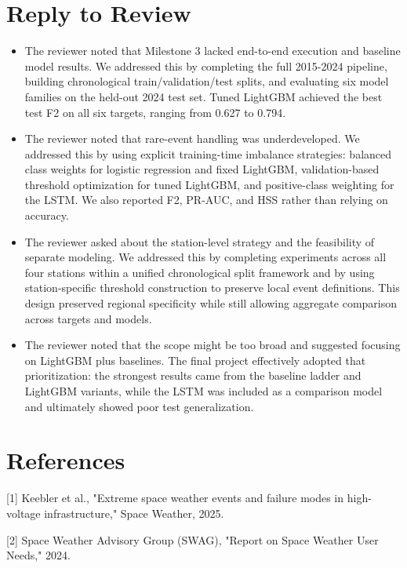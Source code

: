 \documentclass[conference]{IEEEtran}
\begin{document}
\section*{Reply to Review}
\begin{itemize}
    \item The reviewer noted that Milestone 3 lacked end-to-end execution and baseline model results. We addressed this by completing the full 2015-2024 pipeline, building chronological train/validation/test splits, and evaluating six model families on the held-out 2024 test set. Tuned LightGBM achieved the best test F2 on all six targets, ranging from 0.627 to 0.794.

    \item The reviewer noted that rare-event handling was underdeveloped. We addressed this by using explicit training-time imbalance strategies: balanced class weights for logistic regression and fixed LightGBM, validation-based threshold optimization for tuned LightGBM, and positive-class weighting for the LSTM. We also reported F2, PR-AUC, and HSS rather than relying on accuracy.

    \item The reviewer asked about the station-level strategy and the feasibility of separate modeling. We addressed this by completing experiments across all four stations within a unified chronological split framework and by using station-specific threshold construction to preserve local event definitions. This design preserved regional specificity while still allowing aggregate comparison across targets and models.

    \item The reviewer noted that the scope might be too broad and suggested focusing on LightGBM plus baselines. The final project effectively adopted that prioritization: the strongest results came from the baseline ladder and LightGBM variants, while the LSTM was included as a comparison model and ultimately showed poor test generalization.
\end{itemize}

\section*{References}

[1] Keebler et al., "Extreme space weather events and failure modes in high-voltage infrastructure," Space Weather, 2025.

[2] Space Weather Advisory Group (SWAG), "Report on Space Weather User Needs," 2024.
\end{document}
